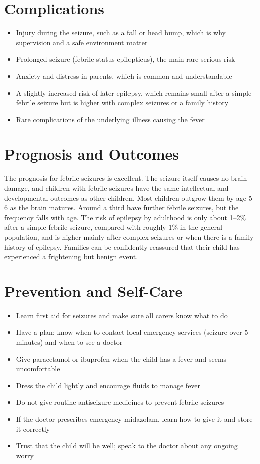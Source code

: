 \section*{Complications}
\begin{itemize}
    \item Injury during the seizure, such as a fall or head bump, which is why supervision and a safe environment matter
    \item Prolonged seizure (febrile status epilepticus), the main rare serious risk
    \item Anxiety and distress in parents, which is common and understandable
    \item A slightly increased risk of later epilepsy, which remains small after a simple febrile seizure but is higher with complex seizures or a family history
    \item Rare complications of the underlying illness causing the fever
\end{itemize}

\section*{Prognosis and Outcomes}
The prognosis for febrile seizures is excellent. The seizure itself causes no brain damage, and children with febrile seizures have the same intellectual and developmental outcomes as other children. Most children outgrow them by age 5--6 as the brain matures. Around a third have further febrile seizures, but the frequency falls with age. The risk of epilepsy by adulthood is only about 1--2\% after a simple febrile seizure, compared with roughly 1\% in the general population, and is higher mainly after complex seizures or when there is a family history of epilepsy. Families can be confidently reassured that their child has experienced a frightening but benign event.

\section*{Prevention and Self-Care}
\begin{itemize}
    \item Learn first aid for seizures and make sure all carers know what to do
    \item Have a plan: know when to contact local emergency services (seizure over 5 minutes) and when to see a doctor
    \item Give paracetamol or ibuprofen when the child has a fever and seems uncomfortable
    \item Dress the child lightly and encourage fluids to manage fever
    \item Do not give routine antiseizure medicines to prevent febrile seizures
    \item If the doctor prescribes emergency midazolam, learn how to give it and store it correctly
    \item Trust that the child will be well; speak to the doctor about any ongoing worry
\end{itemize}

